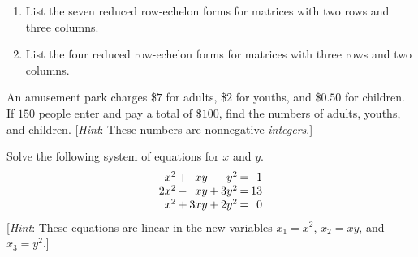 \begin{multicols}{2}
\begin{supex}
\begin{enumerate}[label={\alph*.}]
\item List the seven reduced row-echelon forms for matrices with two rows and three columns.

\item List the four reduced row-echelon forms for matrices with three rows and two columns.

\end{enumerate}
\end{supex}

\begin{supex}
An amusement park charges \$$7$ for adults, \$$2$ for youths, and \$$0.50$ for 
children. If $150$ people enter and pay a total of \$$100$, find the numbers 
of adults, youths, and children. [\textit{Hint}: These numbers are nonnegative \textit{integers}.]

\end{supex}

\begin{supex}
Solve the following system of equations for $x$ and $y$.
\begin{equation*}
\arraycolsep=1pt
\begin{array}{rlrlrcr}
	  x^2 & + &   xy & - &   y^2 & = &  1 \\
	 2x^2 & - &   xy & + &  3y^2 & = & 13 \\
	  x^2 & + &  3xy & + &  2y^2 & = &  0 \\
\end{array}
\end{equation*}
[\textit{Hint}: These equations are linear in the new variables $x_{1} = x^{2}$, $x_{2} = xy$, and $x_{3} = y^{2}$.]

\end{supex}

\end{multicols}
